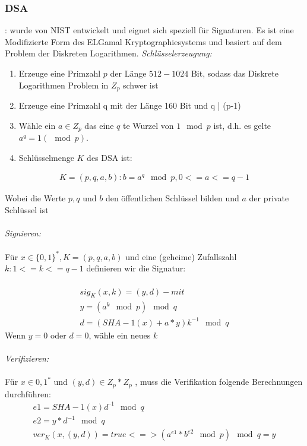 \subsubsection{DSA}:
wurde von NIST entwickelt und eignet sich speziell für Signaturen. Es ist eine Modifizierte Form des ELGamal Kryptographiesystems und basiert auf dem Problem der Diskreten Logarithmen. 
\textit{Schlüsselerzeugung:} 
\begin{enumerate}
\item Erzeuge eine Primzahl $p$ der Länge $512-1024$ Bit, sodass das Diskrete
Logarithmen Problem in $Z_p$ schwer ist
\item Erzeuge eine Primzahl q mit der Länge 160 Bit und q | (p-1)
\item Wähle ein $a \in Z_p$ das eine $q$ te Wurzel von $1 \mod p$ ist, d.h. es gelte
$a^q = 1 (\mod p)$.
\item Schlüsselmenge $K$ des DSA ist:

\end{enumerate}
\begin{equation}
	\begin{split}
		K=(p,q,a,b) :b=a^q \mod p,     0<=a<=q-1
 	\end{split}
\end{equation}
	
Wobei die Werte $p, q$ und $b$ den öffentlichen Schlüssel bilden und
$a$ der private Schlüssel ist
\\\\
\textit{Signieren:} 
\\\\
Für $x \in \{0,1\}^*, K = (p, q,  a, b)$ und eine (geheime) Zufallszahl $k: 1<=k<= q-1$
definieren wir die Signatur:
\\\\
\begin{equation}
	\begin{split}
		sig_K(x,k)=(y,d)-    mit	\\	
	y=(a^k \mod p) \mod q \\
			d=(SHA-1(x)+a*y)k^{-1} \mod q 
 	\end{split}
\end{equation}
Wenn $y = 0$ oder $d = 0$, wähle ein neues $k$	
\\\\
\textit{Verifizieren:}
\\\\
Für $x \in {0,1}^*$ und $(y, d) \in Z_p * Z_p$ , muss die Verifikation folgende
Berechnungen durchführen:
\begin{equation}
\begin{split}
		e1 = SHA-1(x) d^{–1} \mod q	\\	
		e2 = y*d^{-1} \mod q \\
			ver_K(x, (y,d)) = true <=> (a^{e1}*b^{e2} \mod p) \mod q = y 
\end{split}
\end{equation}